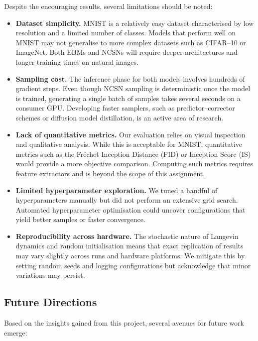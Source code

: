 Despite the encouraging results, several limitations should be noted:

\begin{itemize}[leftmargin=*]
  \item \textbf{Dataset simplicity.}  MNIST is a relatively easy dataset
    characterised by low resolution and a limited number of classes.
    Models that perform well on MNIST may not generalise to more complex
    datasets such as CIFAR–10 or ImageNet.  Both EBMs and NCSNs will
    require deeper architectures and longer training times on natural
    images.
  \item \textbf{Sampling cost.}  The inference phase for both models
    involves hundreds of gradient steps.  Even though NCSN sampling is
    deterministic once the model is trained, generating a single batch of
    samples takes several seconds on a consumer GPU.  Developing faster
    samplers, such as predictor–corrector schemes or diffusion model
    distillation, is an active area of research.
  \item \textbf{Lack of quantitative metrics.}  Our evaluation relies on
    visual inspection and qualitative analysis.  While this is acceptable
    for MNIST, quantitative metrics such as the Fréchet Inception
    Distance (FID) or Inception Score (IS) would provide a more objective
    comparison.  Computing such metrics requires feature extractors and is
    beyond the scope of this assignment.
  \item \textbf{Limited hyperparameter exploration.}  We tuned a
    handful of hyperparameters manually but did not perform an extensive
    grid search.  Automated hyperparameter optimisation could uncover
    configurations that yield better samples or faster convergence.
  \item \textbf{Reproducibility across hardware.}  The stochastic nature
    of Langevin dynamics and random initialisation means that exact
    replication of results may vary slightly across runs and hardware
    platforms.  We mitigate this by setting random seeds and logging
    configurations but acknowledge that minor variations may persist.
\end{itemize}

\subsection{Future Directions}

Based on the insights gained from this project, several avenues for
future work emerge:

